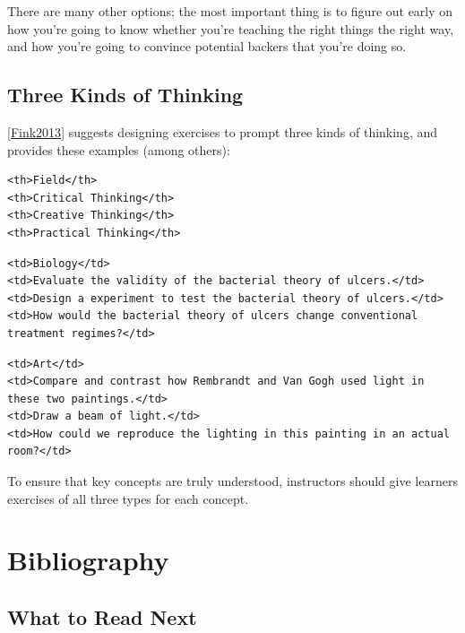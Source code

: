 \documentclass[10pt,statementpaper]{memoir}
\begin{document}
There are many other options; the most important thing is to figure out
early on how you're going to know whether you're teaching the right
things the right way, and how you're going to convince potential backers
that you're doing so.

\section{Three Kinds of Thinking}\label{three-kinds-of-thinking}

{[}\href{biblio.html\#fink-significant}{Fink2013}{]} suggests designing
exercises to prompt three kinds of thinking, and provides these examples
(among others):

\begin{verbatim}
<th>Field</th>
<th>Critical Thinking</th>
<th>Creative Thinking</th>
<th>Practical Thinking</th>
\end{verbatim}

\begin{verbatim}
<td>Biology</td>
<td>Evaluate the validity of the bacterial theory of ulcers.</td>
<td>Design a experiment to test the bacterial theory of ulcers.</td>
<td>How would the bacterial theory of ulcers change conventional treatment regimes?</td>
\end{verbatim}

\begin{verbatim}
<td>Art</td>
<td>Compare and contrast how Rembrandt and Van Gogh used light in these two paintings.</td>
<td>Draw a beam of light.</td>
<td>How could we reproduce the lighting in this painting in an actual room?</td>
\end{verbatim}

To ensure that key concepts are truly understood, instructors should
give learners exercises of all three types for each concept.

\chapter{Bibliography}\label{bibliography}

\section{What to Read Next}\label{what-to-read-next}
\end{document}
